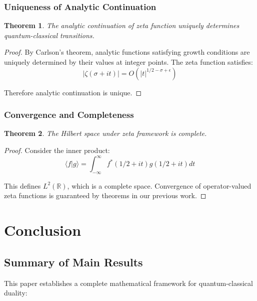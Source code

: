 \documentclass[11pt]{article}
\theoremstyle{plain}
\newtheorem{theorem}{Theorem}[section]
\theoremstyle{definition}
\theoremstyle{remark}
\begin{document}
\subsubsection{Uniqueness of Analytic Continuation}

\begin{theorem}
The analytic continuation of zeta function uniquely determines quantum-classical transitions.
\end{theorem}

\begin{proof}
By Carlson's theorem, analytic functions satisfying growth conditions are uniquely determined by their values at integer points. The zeta function satisfies:
$$|\zeta(\sigma + it)| = O(|t|^{1/2-\sigma+\epsilon})$$

Therefore analytic continuation is unique.
\end{proof}

\subsubsection{Convergence and Completeness}

\begin{theorem}
The Hilbert space under zeta framework is complete.
\end{theorem}

\begin{proof}
Consider the inner product:
$$\langle f|g \rangle = \int_{-\infty}^{\infty} f^*(1/2 + it) g(1/2 + it) dt$$

This defines $L^2(\mathbb{R})$, which is a complete space. Convergence of operator-valued zeta functions is guaranteed by theorems in our previous work.
\end{proof}

\section{Conclusion}

\subsection{Summary of Main Results}

This paper establishes a complete mathematical framework for quantum-classical duality:
\end{document}
